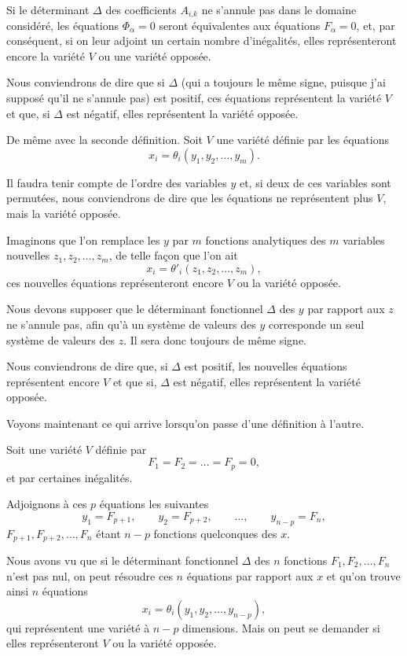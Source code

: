 \documentclass{article}
\begin{document}
Si le déterminant $\Delta$ des coefficients $A_{i.k}$ ne s'annule pas dans le domaine considéré, les équations $\Phi_{\alpha} = 0$ seront équivalentes aux équations $F_{\alpha} = 0$, et, par conséquent, si on leur adjoint un certain nombre d'inégalités, elles représenteront encore la variété $V$ ou une variété opposée.

Nous conviendrons de dire que si $\Delta$ (qui a toujours le même signe, puisque j'ai supposé qu'il ne s'annule pas) est positif, ces équations représentent la variété $V$ et que, si $\Delta$ est négatif, elles représentent la variété opposée.

De même avec la seconde définition. Soit $V$ une variété définie par les équations
\[
x_{i} = \theta_{i}(y_{1}, y_{2}, \ldots, y_{m}).
\]

Il faudra tenir compte de l'ordre des variables $y$ et, si deux de ces variables sont permutées, nous conviendrons de dire que les équations ne représentent plus $V$, mais la variété opposée.

Imaginons que l'on remplace les $y$ par $m$ fonctions analytiques des $m$ variables nouvelles $z_{1}, z_{2}, \ldots, z_{m}$, de telle façon que l'on ait
\[
x_{i} = \theta'_{i}(z_{1}, z_{2}, \ldots, z_{m}),
\]
ces nouvelles équations représenteront encore $V$ ou la variété opposée.

Nous devons supposer que le déterminant fonctionnel $\Delta$ des $y$ par rapport aux $z$ ne s'annule pas, afin qu'à un système de valeurs des $y$ corresponde un seul système de valeurs des $z$. Il sera donc toujours de même signe.

Nous conviendrons de dire que, si $\Delta$ est positif, les nouvelles équations représentent encore $V$ et que si, $\Delta$ est négatif, elles représentent la variété opposée.

Voyons maintenant ce qui arrive lorsqu'on passe d'une définition à l'autre.

Soit une variété $V$ définie par
\[
F_{1} = F_{2} = \ldots = F_{p} = 0,
\]
et par certaines inégalités.

Adjoignons à ces $p$ équations les suivantes
\[
y_{1} = F_{p+1}, \qquad y_{2} = F_{p+2}, \qquad \ldots, \qquad y_{n-p} = F_{n},
\]
$F_{p+1}, F_{p+2}, \ldots, F_{n}$ étant $n - p$ fonctions quelconques des $x$.

Nous avons vu que si le déterminant fonctionnel $\Delta$ des $n$ fonctions $F_{1}, F_{2}, \ldots, F_{n}$ n'est pas nul, on peut résoudre ces $n$ équations par rapport aux $x$ et qu'on trouve ainsi $n$ équations
\[
x_{i} = \theta_{i}(y_{1}, y_{2}, \ldots, y_{n-p}),
\]
qui représentent une variété à $n - p$ dimensions. Mais on peut se demander si elles représenteront $V$ ou la variété opposée.
\end{document}
